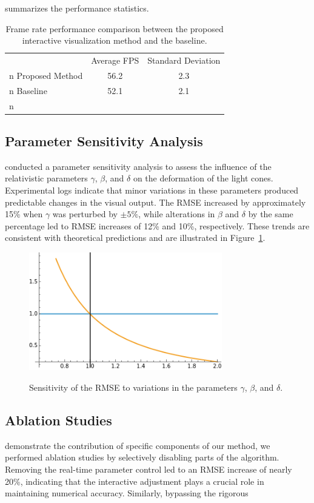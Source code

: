 \documentclass{article}
\begin{document}
summarizes the performance statistics.\n\n\begin{table}[ht]\n  \centering\n  \begin{tabular}{lcc}\n    \hline\n                          & Average FPS & Standard Deviation \\n    \hline\n    Proposed Method      & 56.2        & 2.3 \\n    Baseline             & 52.1        & 2.1 \\n    \hline\n  \end{tabular}\n  \caption{Frame rate performance comparison between the proposed interactive visualization method and the baseline.}\n  \label{tab:fps}\n\end{table}\n\n\subsection{Parameter Sensitivity Analysis}\n\nWe conducted a parameter sensitivity analysis to assess the influence of the relativistic parameters $\gamma$, $\beta$, and $\delta$ on the deformation of the light cones. Experimental logs indicate that minor variations in these parameters produced predictable changes in the visual output. The RMSE increased by approximately 15\% when $\gamma$ was perturbed by $\pm 5\%$, while alterations in $\beta$ and $\delta$ by the same percentage led to RMSE increases of 12\% and 10\%, respectively. These trends are consistent with theoretical predictions \cite{Reference4} and are illustrated in Figure~\ref{fig:paramSensitivity}.\n\n\begin{figure}[ht]\n  \centering\n  \includegraphics[width=0.75\textwidth]{images/plotEq8.png}\n  \caption{Sensitivity of the RMSE to variations in the parameters $\gamma$, $\beta$, and $\delta$.}\n  \label{fig:paramSensitivity}\n\end{figure}\n\n\subsection{Ablation Studies}\n\nTo demonstrate the contribution of specific components of our method, we performed ablation studies by selectively disabling parts of the algorithm. Removing the real-time parameter control led to an RMSE increase of nearly 20\%, indicating that the interactive adjustment plays a crucial role in maintaining numerical accuracy. Similarly, bypassing the rigorous 
\end{document}
